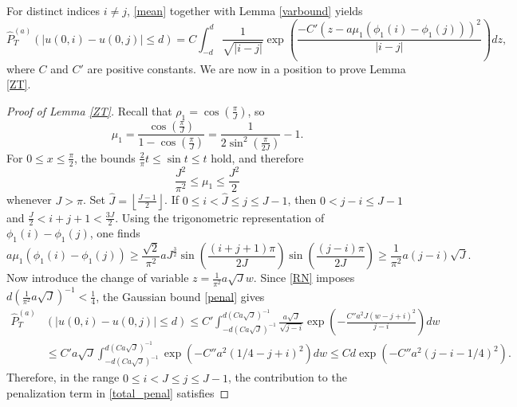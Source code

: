 \documentclass[12pt]{amsart}
\numberwithin{equation}{section}
\newcommand{\1}{\mathbf{1}}
\begin{document}
For distinct indices $i\neq j$, \eqref{mean} together with Lemma \ref{varbound} yields
\begin{equation}
\label{penal}
    \widehat{P}^{(a)}_T(|u(0,i)-u(0,j)|\leq d)=C\int_{-d}^d\frac{1}{\sqrt{\vert i-j\vert}}\exp\left(\frac{-C'(z-a\mu_1(\phi_1(i)-\phi_1(j)))^2}{\vert i-j\vert}\right)dz,
\end{equation}
where $C$ and $C'$ are positive constants. We are now in a position to prove Lemma \ref{ZT}.
\begin{proof}[Proof of Lemma \ref{ZT}]
    Recall that $\rho_1=\cos\left(\frac{\pi}{J}\right)$, so
    \begin{equation*}
        \mu_1=\frac{\cos\left(\frac{\pi}{J}\right)}{1-\cos\left(\frac{\pi}{J}\right)}=\frac{1}{2\sin^2\left(\frac{\pi}{2J}\right)}-1.
    \end{equation*}
    For $0\leq x\leq\frac{\pi}{2}$, the bounds $\frac{2}{\pi}t\leq \sin t\leq t$ hold, and therefore
    \begin{equation*}
        \frac{J^2}{\pi^2}\leq \mu_1\leq \frac{J^2}{2}
    \end{equation*}
    whenever $J>\pi$. Set $\hat{J}=\left\lfloor\frac{J-1}{2}\right\rfloor$. If $0\leq i<\hat{J}\leq j\leq J-1$, then $0<j-i\leq J-1$ and $\frac{J}{2}<i+j+1<\frac{3J}{2}$. Using the trigonometric representation of $\phi_1(i)-\phi_1(j)$, one finds
    \begin{equation*}
        a\mu_1(\phi_1(i)-\phi_1(j))\geq \frac{\sqrt{2}}{\pi^2}aJ^{\frac{3}{2}}\sin\left(\frac{(i+j+1)\pi}{2J}\right)\sin\left(\frac{(j-i)\pi}{2J}\right)\geq \frac{1}{\pi^2}a(j-i)\sqrt{J}.
    \end{equation*}
    Now introduce the change of variable $z=\frac{1}{\pi^2}a\sqrt{J}w$. Since \eqref{RN} imposes $d\left(\frac{1}{\pi^2}a\sqrt{J}\right)^{-1}<\frac{1}{4}$, the Gaussian bound \eqref{penal} gives
    \begin{equation*}
    \begin{split}
        \widehat{P}^{(a)}_T&(|u(0,i)-u(0,j)|\leq d)\leq C'\int_{-d(Ca\sqrt{J})^{-1}}^{d(Ca\sqrt{J})^{-1}}\frac{a\sqrt{J}}{\sqrt{j-i}}\exp\left(-\frac{C''a^2J(w-j+i)^2}{j-i}\right)dw\\
        &\leq C'a\sqrt{J}\int_{-d(Ca\sqrt{J})^{-1}}^{d(Ca\sqrt{J})^{-1}}\exp\left(-C''a^2\left(1/4-j+i\right)^2\right)dw\leq Cd\exp\left(-C''a^2(j-i-1/4)^2\right).
    \end{split}
    \end{equation*}
Therefore, in the range $0\le i<\hat{J}\le j\le J-1$, the contribution to the penalization term in \eqref{total_penal} satisfies

\end{proof}
\end{document}
